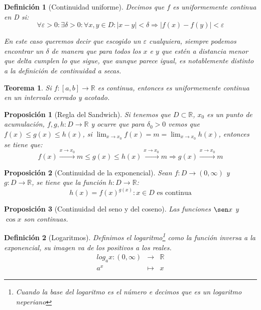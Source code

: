\documentclass[10pt,a4paper,openright]{book}
\newtheorem{teorema}{Teorema}[chapter]
\newtheorem{proposicion}{Proposición}[chapter]
\newtheorem{definicion}{Definición}[chapter]
\begin{document}
\begin{definicion}[Continuidad uniforme]
Decimos que $f$ es uniformemente continua en D si:
$$\forall \varepsilon>0: \exists \delta>0 : \forall x, y \in D: |x-y|<\delta \Rightarrow |f(x)-f(y)|<\varepsilon$$

En este caso queremos decir que escogido un $\varepsilon$ cualquiera, siempre podemos encontrar un $\delta$ de manera que para todos los $x$ e $y$ que estén a distancia menor que delta cumplen lo que sigue, que aunque parece igual, es notablemente distinto a la definición de continuidad a secas.
\end{definicion}

\begin{teorema}
Si $f:[a,b]\rightarrow \mathbb R$ es continua, entonces es uniformemente continua en un intervalo cerrado y acotado.
\end{teorema}

\begin{proposicion}[Regla del Sandwich]
Si tenemos que $D\subset \mathbb R$, $x_0$ es un punto de acumulación, $f,g,h: D\rightarrow\mathbb R$ y ocurre que para $\delta_0>0$ vemos que $f(x)\leq g(x)\leq h(x)$, si $\lim_{x\rightarrow x_0} f(x)=m=\lim_{x\rightarrow x_0} h(x)$, entonces se tiene que:
$$f(x)\xrightarrow{x\rightarrow x_0} m \leq g(x)\leq h(x)\xrightarrow{x\rightarrow x_0}m\Rightarrow g(x)\xrightarrow{x\rightarrow x_0}m$$
\end{proposicion}

\begin{proposicion}[Continuidad de la exponencial]
Sean $f: D\rightarrow (0,\infty)$ y $g: D\rightarrow \mathbb R$, se tiene que la función $h: D\rightarrow \mathbb R$:
$$h(x)=f(x)^{g(x)}: x\in D \mbox{ es continua}$$
\end{proposicion}

\begin{proposicion}[Continuidad del seno y del coseno]
Las funciones $\sen x$ y $\cos x$ son continuas.
\end{proposicion}

\begin{definicion}[Logaritmos]
Definimos el logaritmo\footnote{Cuando la base del logaritmo es el número \textit{e} decimos que es un \textit{logaritmo neperiano}} como la función inversa a la exponencial, su imagen va de los positivos a los reales.
\begin{eqnarray*} log_a x: (0,\infty) &\longrightarrow& \mathbb R \\ a^x &\longmapsto& x \end{eqnarray*}
\end{definicion}
\end{document}
